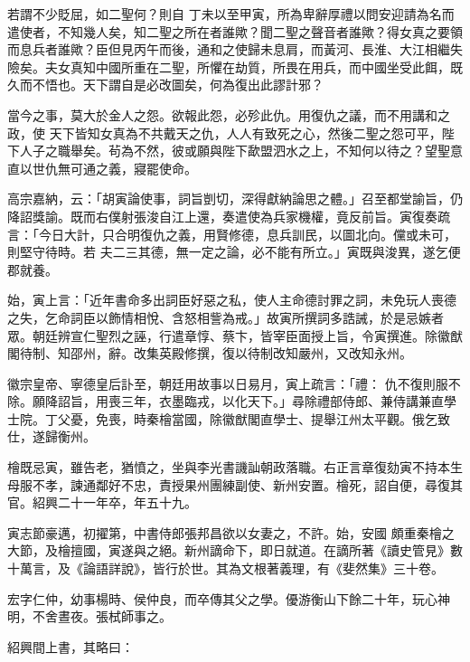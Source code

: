 \begin{pinyinscope}
 若謂不少貶屈，如二聖何？則自
 丁未以至甲寅，所為卑辭厚禮以問安迎請為名而遣使者，不知幾人矣，知二聖之所在者誰歟？聞二聖之聲音者誰歟？得女真之要領而息兵者誰歟？臣但見丙午而後，通和之使歸未息肩，而黃河、長淮、大江相繼失險矣。夫女真知中國所重在二聖，所懼在劫質，所畏在用兵，而中國坐受此餌，既久而不悟也。天下謂自是必改圖矣，何為復出此謬計邪？



 當今之事，莫大於金人之怨。欲報此怨，必殄此仇。用復仇之議，而不用講和之政，使
 天下皆知女真為不共戴天之仇，人人有致死之心，然後二聖之怨可平，陛下人子之職舉矣。茍為不然，彼或願與陛下歃盟泗水之上，不知何以待之？望聖意直以世仇無可通之義，寢罷使命。



 高宗嘉納，云：「胡寅論使事，詞旨剴切，深得獻納論思之體。」召至都堂諭旨，仍降詔獎諭。既而右僕射張浚自江上還，奏遣使為兵家機權，竟反前旨。寅復奏疏言：「今日大計，只合明復仇之義，用賢修德，息兵訓民，以圖北向。儻或未可，則堅守待時。若
 夫二三其德，無一定之論，必不能有所立。」寅既與浚異，遂乞便郡就養。



 始，寅上言：「近年書命多出詞臣好惡之私，使人主命德討罪之詞，未免玩人喪德之失，乞命詞臣以飾情相悅、含怒相訾為戒。」故寅所撰詞多誥誡，於是忌嫉者眾。朝廷辨宣仁聖烈之誣，行遣章惇、蔡卞，皆宰臣面授上旨，令寅撰進。除徽猷閣待制、知邵州，辭。改集英殿修撰，復以待制改知嚴州，又改知永州。



 徽宗皇帝、寧德皇后訃至，朝廷用故事以日易月，寅上疏言：「禮：
 仇不復則服不除。願降詔旨，用喪三年，衣墨臨戎，以化天下。」尋除禮部侍郎、兼侍講兼直學士院。丁父憂，免喪，時秦檜當國，除徽猷閣直學士、提舉江州太平觀。俄乞致仕，遂歸衡州。



 檜既忌寅，雖告老，猶憤之，坐與李光書譏訕朝政落職。右正言章復劾寅不持本生母服不孝，諫通鄰好不忠，責授果州團練副使、新州安置。檜死，詔自便，尋復其官。紹興二十一年卒，年五十九。



 寅志節豪邁，初擢第，中書侍郎張邦昌欲以女妻之，不許。始，安國
 頗重秦檜之大節，及檜擅國，寅遂與之絕。新州謫命下，即日就道。在謫所著《讀史管見》數十萬言，及《論語詳說》，皆行於世。其為文根著義理，有《斐然集》三十卷。



 宏字仁仲，幼事楊時、侯仲良，而卒傳其父之學。優游衡山下餘二十年，玩心神明，不舍晝夜。張栻師事之。



 紹興間上書，其略曰：




\end{pinyinscope}

